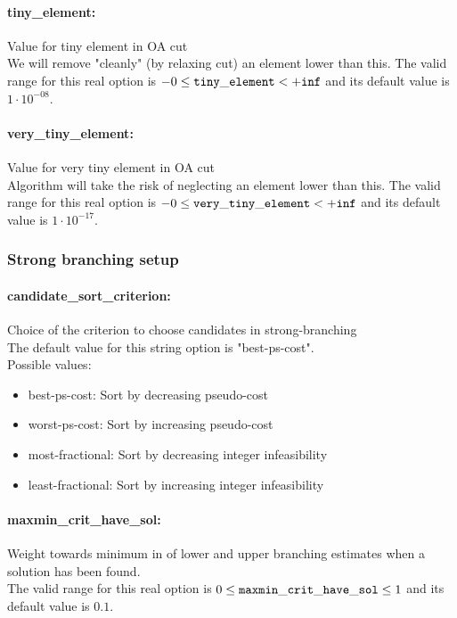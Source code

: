 \paragraph{tiny\_element:}\label{sec:tiny_element} Value for tiny element in OA cut $\;$ \\
 We will remove "cleanly" (by relaxing cut) an
element lower than this. The valid range for this real option is 
$-0 \le {\tt tiny\_element } <  {\tt +inf}$
and its default value is $1 \cdot 10^{-08}$.


\paragraph{very\_tiny\_element:}\label{sec:very_tiny_element} Value for very tiny element in OA cut $\;$ \\
 Algorithm will take the risk of neglecting an
element lower than this. The valid range for this real option is 
$-0 \le {\tt very\_tiny\_element } <  {\tt +inf}$
and its default value is $1 \cdot 10^{-17}$.




\subsubsection{Strong branching setup}
\label{sec:Strong_branching_setup}

\paragraph{candidate\_sort\_criterion:}\label{sec:candidate_sort_criterion} Choice of the criterion to choose candidates in strong-branching $\;$ \\
The default value for this string option is "best-ps-cost".
\\ 
Possible values:
\begin{itemize}
   \item best-ps-cost: Sort by decreasing pseudo-cost
   \item worst-ps-cost: Sort by increasing pseudo-cost
   \item most-fractional: Sort by decreasing integer infeasibility
   \item least-fractional: Sort by increasing integer infeasibility
\end{itemize}

\paragraph{maxmin\_crit\_have\_sol:}\label{sec:maxmin_crit_have_sol} Weight towards minimum in of lower and upper branching estimates when a solution has been found. $\;$ \\
 The valid range for this real option is 
$0 \le {\tt maxmin\_crit\_have\_sol } \le 1$
and its default value is $0.1$.


